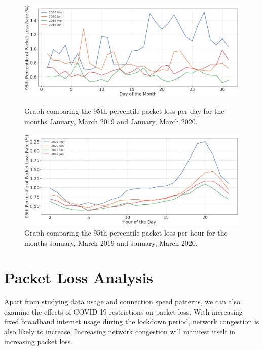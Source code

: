\begin{figure}[t]
  \begin{minipage}[t]{0.496\linewidth}
    \centering
    \includegraphics[width=0.98\linewidth]{figs/packet_loss_per_day.png}
    \caption{Graph comparing the 95th percentile packet loss per day for the months January, March 2019 and January, March 2020.}
    \label{fig:packetlossperday}
  \end{minipage}
  \begin{minipage}[t]{0.496\linewidth}
    \centering
    \includegraphics[width=0.98\linewidth]{figs/packet_loss_per_hour.png}
    \caption{Graph comparing the 95th percentile packet loss per hour for the months January, March 2019 and January, March 2020.}
    \label{fig:packetlossperhour}
  \end{minipage}
\end{figure}

\section{Packet Loss Analysis}\label{sec:packet-loss-analysis}

Apart from studying data usage and connection speed patterns, we can also examine the effects of COVID-19 restrictions on packet loss. With increasing fixed broadband internet usage during the lockdown period, network congestion is also likely to increase. Increasing network congestion will manifest itself in increasing packet loss.

